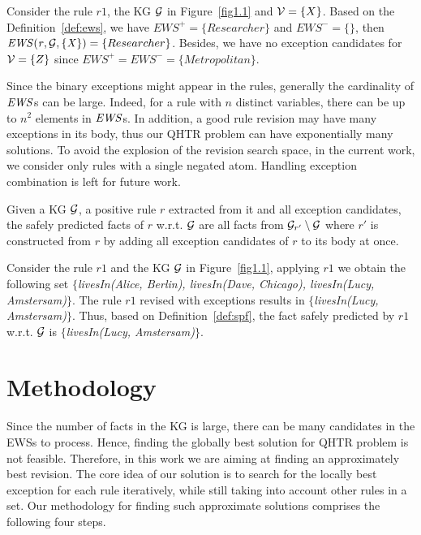 \begin{example}
Consider the rule $r1$, the KG $\mathcal{G}$ in Figure~\ref{fig1.1} and $\mathcal{V} = \{X\}$. Based on the Definition~\ref{def:ews}, we have $EWS^+ = \{Researcher\}$ and $EWS^- = \{\}$, then $\mathit{EWS(r,\mathcal{G},\{X\})}=\{Researcher\}$. Besides, we have no exception candidates for $\mathcal{V} = \{Z\}$ since $EWS^+ = EWS^- = \{Metropolitan\}$.
\end{example}

Since the binary exceptions might appear in the rules, generally the cardinality of $\mathit{EWS}$s can be large. Indeed, for a rule with $n$ distinct variables, there can be up to $n^2$ elements in $\mathit{EWS}$s. In addition, a good rule revision may have many exceptions in its body, thus our QHTR problem can have exponentially many solutions. To avoid the explosion of the revision search space, in the current work, we consider only rules with a single negated atom. Handling exception combination is left for future work.

\begin{definition} \label{def:spf}
Given a KG $\mathcal{G}$, a positive rule $r$ extracted from it and all exception candidates, the safely predicted facts of $r$ w.r.t. $\mathcal{G}$ are all facts from $\mathcal{G}_{r'} \setminus \mathcal{G}$ where $r'$ is constructed from $r$ by adding all exception candidates of $r$ to its body at once.
\end{definition}

\begin{example}
Consider the rule $r1$ and the KG $\mathcal{G}$ in Figure~\ref{fig1.1}, applying $r1$ we obtain the following set \textit{$\{$livesIn(Alice, Berlin), livesIn(Dave, Chicago), livesIn(Lucy, Amstersam)$\}$}. The rule $r1$ revised with exceptions results in \textit{$\{$livesIn(Lucy, Amstersam)$\}$}. Thus, based on Definition~\ref{def:spf}, the fact safely predicted by $r1$ w.r.t. $\mathcal{G}$ is \textit{$\{$livesIn(Lucy, Amstersam)$\}$}.
\end{example}

\section{Methodology}\label{sec:meth}

Since the number of facts in the KG is large, there can be many candidates in the EWSs to process. Hence, finding the globally best solution for QHTR problem is not feasible. Therefore, in this work we are aiming at finding an approximately best revision. The core idea of our solution is to search for the locally best exception for each rule iteratively, while still taking into account other rules in a set. Our methodology for finding such approximate solutions comprises the following four steps.
\medskip

